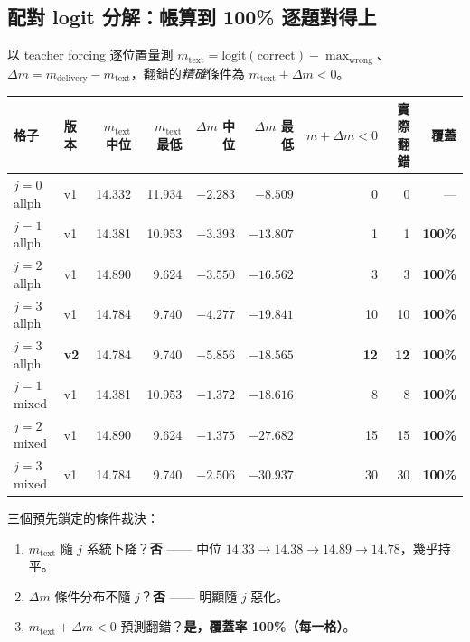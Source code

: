 \documentclass[11pt, a4paper]{article}
\begin{document}
\subsection{配對 logit 分解：帳算到 100\% 逐題對得上}

以 teacher forcing 逐位置量測
$m_{\text{text}} = \text{logit}(\text{correct}) - \max_{\text{wrong}}$、
$\Delta m = m_{\text{delivery}} - m_{\text{text}}$，翻錯的\emph{精確}條件為
$m_{\text{text}} + \Delta m < 0$。

\begin{table}[h]
\centering
\small
\begin{tabular}{llrrrrrrr}
\toprule
格子 & 版本 & $m_{\text{text}}$ 中位 & $m_{\text{text}}$ 最低 & \textbf{$\Delta m$ 中位} & \textbf{$\Delta m$ 最低} & $m{+}\Delta m{<}0$ & 實際翻錯 & 覆蓋 \\
\midrule
$j{=}0$ allph & v1 & 14.332 & 11.934 & $-2.283$ & $-8.509$ & 0 & 0 & --- \\
$j{=}1$ allph & v1 & 14.381 & 10.953 & $-3.393$ & $-13.807$ & 1 & 1 & \textbf{100\%} \\
$j{=}2$ allph & v1 & 14.890 & 9.624 & $-3.550$ & $-16.562$ & 3 & 3 & \textbf{100\%} \\
$j{=}3$ allph & v1 & 14.784 & 9.740 & \textbf{$-4.277$} & $-19.841$ & 10 & 10 & \textbf{100\%} \\
$j{=}3$ allph & \textbf{v2} & 14.784 & 9.740 & \textbf{$-5.856$} & $-18.565$ & \textbf{12} & \textbf{12} & \textbf{100\%} \\
$j{=}1$ mixed & v1 & 14.381 & 10.953 & $-1.372$ & $-18.616$ & 8 & 8 & \textbf{100\%} \\
$j{=}2$ mixed & v1 & 14.890 & 9.624 & $-1.375$ & \textbf{$-27.682$} & 15 & 15 & \textbf{100\%} \\
$j{=}3$ mixed & v1 & 14.784 & 9.740 & $-2.506$ & \textbf{$-30.937$} & 30 & 30 & \textbf{100\%} \\
\bottomrule
\end{tabular}
\end{table}

三個預先鎖定的條件裁決：

\begin{enumerate}
  \item $m_{\text{text}}$ 隨 $j$ 系統下降？\textbf{否} —— 中位 $14.33 \to 14.38 \to 14.89 \to 14.78$，幾乎持平。
  \item $\Delta m$ 條件分布不隨 $j$？\textbf{否} —— 明顯隨 $j$ 惡化。
  \item $m_{\text{text}} + \Delta m < 0$ 預測翻錯？\textbf{是，覆蓋率 100\%（每一格）}。
\end{enumerate}
\end{document}
